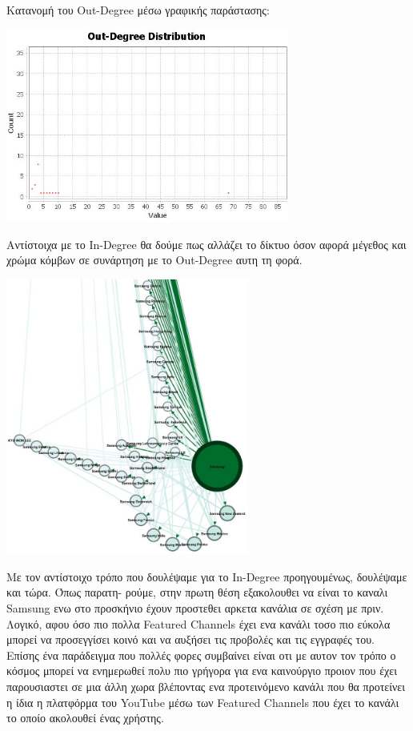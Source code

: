 \documentclass[12pt]{article}
\begin{document}
	\newpage
	Κατανομή του Out-Degree μέσω γραφικής παράστασης:
	\begin{center}
		\includegraphics[width=0.7\textwidth]{photos-files/section6/out-degree_graphical.JPG}
	\end{center}
	Αντίστοιχα με το In-Degree θα δούμε πως αλλάζει το δίκτυο όσον αφορά μέγεθος και χρώμα κόμβων σε συνάρτηση με το Out-Degree αυτη τη φορά.
	\begin{center}
		\includegraphics[width=0.6\textwidth]{photos-files/section6/out-degree_RE-layout.JPG}
	\end{center}
	Με τον αντίστοιχο τρόπο που δουλέψαμε για το In-Degree προηγουμένως, δουλέψαμε και τώρα. Όπως παρατη- ρούμε, στην πρωτη θέση εξακολουθει να είναι το καναλι Samsung ενω στο προσκήνιο έχουν προστεθει αρκετα κανάλια σε σχέση με πριν. Λογικό, αφου όσο πιο πολλα Featured Channels έχει ενα κανάλι τοσο πιο εύκολα μπορεί να προσεγγίσει κοινό και να αυξήσει τις προβολές και τις εγγραφές του. Επίσης ένα παράδειγμα που πολλές φορες συμβαίνει είναι οτι με αυτον τον τρόπο ο κόσμος μπορεί να ενημερωθεί πολυ πιο γρήγορα για ενα καινούργιο προιον που έχει παρουσιαστει σε μια άλλη χωρα βλέποντας ενα προτεινόμενο κανάλι που θα προτείνει η ίδια η πλατφόρμα του YouTube μέσω των Featured Channels που έχει το κανάλι το οποίο ακολουθεί ένας χρήστης.
	
\end{document}
